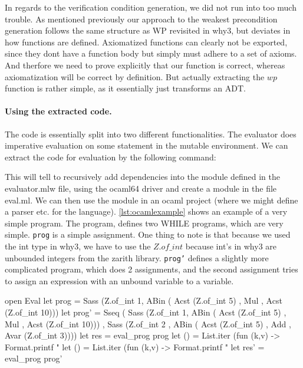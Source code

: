 In regards to the verification condition generation, we did not run into too much trouble.
As mentioned previously our approach to the weakest precondition generation follows the same structure as WP revisited in why3\cite{TODO wp revisited}, but deviates in how functions are defined. Axiomatized functions can clearly not be exported, since they dont have a function body but simply must adhere to a set of axioms.
And therfore we need to prove explicitly that our function is correct, whereas axiomatization will be correct by definition.
But actually extracting the $wp$ function is rather simple, as it essentially just transforms an ADT.


\paragraph{Using the extracted code.}
The code is essentially split into two different functionalities.
The evaluator does imperative evaluation on some statement in the mutable environment.
We can extract the code for evaluation by the following command:


This will tell to recursively add dependencies into the module defined in the evaluator.mlw file, using the ocaml64 driver and create a module in the file eval.ml.
We can then use the module in an ocaml project (where we might define a parser etc. for the language).
\autoref{lst:ocamlexample} shows an example of a very simple program.
The program, defines two WHILE programs, which are very simple.
\texttt{prog} is a simple assignment. One thing to note is that because we used the int type in why3, we have to use the \(Z.of\_int\) because int's in why3 are unbounded integers from the zarith library.
\texttt{prog'} defines a slightly more complicated program, which does 2 assignments, and the second assignment tries to assign an expression with an unbound variable to a variable.

\begin{lstlistings}[caption={ocaml program using the evaluator},label={lst:ocamlexample},language=sml]
open Eval
let prog =
             Sass  (Z.of_int 1, ABin (
                        Acst (Z.of_int 5)
                        , Mul
                        , Acst (Z.of_int 10)))
let prog' = Sseq (
             Sass  (Z.of_int 1, ABin (
                        Acst (Z.of_int 5)
                        , Mul
                        , Acst (Z.of_int 10)))
             , Sass (Z.of_int 2 , ABin (
                         Acst (Z.of_int 5)
                       , Add
                       , Avar (Z.of_int 3))))
let res = eval_prog prog
let () = List.iter (fun (k,v) -> Format.printf "%
let () = List.iter (fun (k,v) -> Format.printf "%
let res' = eval_prog prog'
\end{lstlistings}

